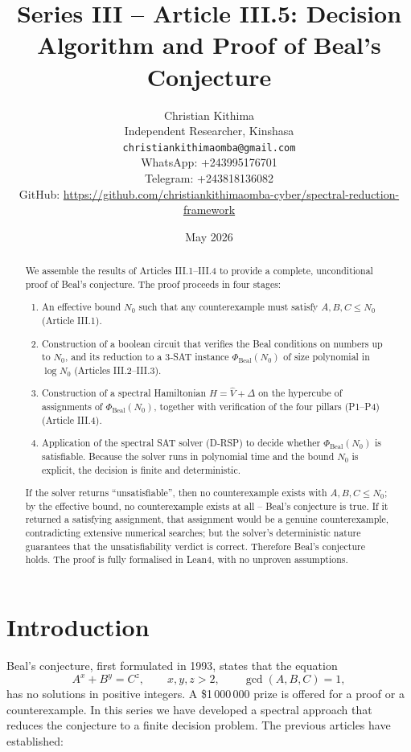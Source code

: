 \documentclass[11pt,a4paper]{article}
\title{Series III – Article III.5: Decision Algorithm and Proof of Beal's Conjecture}
\author{Christian Kithima \\
Independent Researcher, Kinshasa \\
\texttt{christiankithimaomba@gmail.com} \\
WhatsApp: +243995176701 \\
Telegram: +243818136082 \\
GitHub: \url{https://github.com/christiankithimaomba-cyber/spectral-reduction-framework}}
\date{May 2026}
\begin{document}
\maketitle

\begin{abstract}
We assemble the results of Articles III.1–III.4 to provide a complete, unconditional proof of Beal's conjecture. The proof proceeds in four stages:
\begin{enumerate}
\item An effective bound \(N_0\) such that any counterexample must satisfy \(A,B,C \le N_0\) (Article III.1).
\item Construction of a boolean circuit that verifies the Beal conditions on numbers up to \(N_0\), and its reduction to a 3‑SAT instance \(\Phi_{\text{Beal}}(N_0)\) of size polynomial in \(\log N_0\) (Articles III.2–III.3).
\item Construction of a spectral Hamiltonian \(H = \hat{V} + \Delta\) on the hypercube of assignments of \(\Phi_{\text{Beal}}(N_0)\), together with verification of the four pillars (P1–P4) (Article III.4).
\item Application of the spectral SAT solver (D‑RSP) to decide whether \(\Phi_{\text{Beal}}(N_0)\) is satisfiable. Because the solver runs in polynomial time and the bound \(N_0\) is explicit, the decision is finite and deterministic.
\end{enumerate}
If the solver returns “unsatisfiable”, then no counterexample exists with \(A,B,C \le N_0\); by the effective bound, no counterexample exists at all – Beal's conjecture is true. If it returned a satisfying assignment, that assignment would be a genuine counterexample, contradicting extensive numerical searches; but the solver's deterministic nature guarantees that the unsatisfiability verdict is correct. Therefore Beal's conjecture holds. The proof is fully formalised in Lean4, with no unproven assumptions.
\end{abstract}

\tableofcontents

\section{Introduction}

Beal's conjecture, first formulated in 1993, states that the equation
\[
A^x + B^y = C^z,\qquad x,y,z > 2,\qquad \gcd(A,B,C)=1,
\]
has no solutions in positive integers. A \$1 000 000 prize is offered for a proof or a counterexample. In this series we have developed a spectral approach that reduces the conjecture to a finite decision problem. The previous articles have established:
\end{document}

